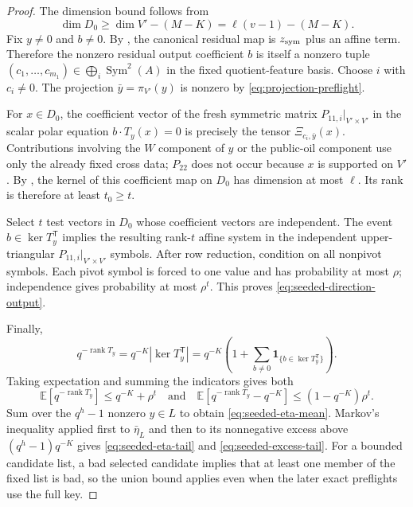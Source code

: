 \documentclass[11pt]{article}
\newcommand{\Sym}{\operatorname{Sym}}
\newcommand{\rank}{\operatorname{rank}}
\newcommand{\transpose}{\mathsf T}
\begin{document}
\begin{proof}
The dimension bound follows from
\[
 \dim D_0\ge\dim V'-(M-K)=\ell(v-1)-(M-K).
\]
Fix $y\ne0$ and $b\ne0$.  By , the canonical residual map is
$z_{\rm sym}$ plus an affine term.  Therefore the nonzero residual output
coefficient $b$ is itself a nonzero tuple
$(c_1,\ldots,c_{m_1})\in\bigoplus_i\Sym^2(A)$ in the fixed quotient-feature
basis.  Choose $i$ with $c_i\ne0$.
The projection $\bar y=\pi_{V'}(y)$ is nonzero by
\eqref{eq:projection-preflight}.

For $x\in D_0$, the coefficient vector of the fresh symmetric matrix
$P_{11,i}|_{V'\times V'}$ in the scalar polar equation
$b\cdot T_y(x)=0$ is precisely the tensor
$\Xi_{c_i,\bar y}(x)$.  Contributions involving the $W$ component of $y$ or
the public-oil component use only the already fixed cross data; $P_{22}$ does
not occur because $x$ is supported on $V'$.  By
, the kernel of this coefficient map on $D_0$
has dimension at most $\ell$.  Its rank is therefore at least
$t_0\ge t$.

Select $t$ test vectors in $D_0$ whose coefficient vectors are independent.
The event $b\in\ker T_y^\transpose$ implies the resulting rank-$t$ affine
system in the independent upper-triangular $P_{11,i}|_{V'\times V'}$ symbols.
After row reduction, condition on all nonpivot symbols.  Each pivot symbol is
forced to one value and has probability at most $\rho$; independence gives
probability at most $\rho^t$.  This proves
\eqref{eq:seeded-direction-output}.

Finally,
\[
 q^{-\rank T_y}=q^{-K}|\ker T_y^\transpose|
 =q^{-K}\left(1+\sum_{b\ne0}
       \mathbf1_{\{b\in\ker T_y^\transpose\}}\right).
\]
Taking expectation and summing the indicators gives both
\[
 \mathbb E[q^{-\rank T_y}]\le q^{-K}+\rho^t
 \quad\text{and}\quad
 \mathbb E[q^{-\rank T_y}-q^{-K}]
 \le(1-q^{-K})\rho^t.
\]
Sum over the $q^h-1$ nonzero $y\in L$ to obtain
\eqref{eq:seeded-eta-mean}.  Markov's inequality applied first to
$\bar\eta_L$ and then to its nonnegative excess above
$(q^h-1)q^{-K}$ gives \eqref{eq:seeded-eta-tail} and
\eqref{eq:seeded-excess-tail}.  For a bounded candidate list, a bad selected
candidate implies that at least one member of the fixed list is bad, so the
union bound applies even when the later exact preflights use the full key.
\end{proof}
\end{document}
